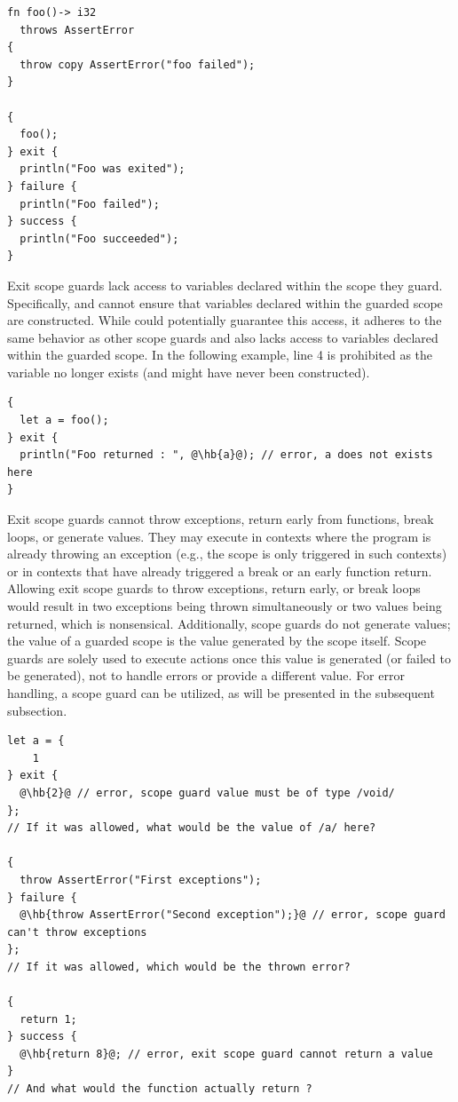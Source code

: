 \begin{lstlisting}[style=coloredverbatim]
fn foo()-> i32
  throws AssertError
{
  throw copy AssertError("foo failed");
}

{
  foo();
} exit {
  println("Foo was exited");
} failure {
  println("Foo failed");
} success {
  println("Foo succeeded");
}
\end{lstlisting}

Exit scope guards lack access to variables declared within the scope they guard.
Specifically,  and  cannot ensure that variables
declared within the guarded scope are constructed. While  could
potentially guarantee this access, it adheres to the same behavior as other
scope guards and also lacks access to variables declared within the guarded
scope. In the following example, line 4 is prohibited as the variable 
no longer exists (and might have never been constructed).

\begin{lstlisting}[style=coloredverbatimError, escapechar=@]
{
  let a = foo();
} exit {
  println("Foo returned : ", @\hb{a}@); // error, a does not exists here
}
\end{lstlisting}

Exit scope guards cannot throw exceptions, return early from functions, break
loops, or generate values. They may execute in contexts where the program is
already throwing an exception (e.g., the  scope is only triggered
in such contexts) or in contexts that have already triggered a break or an early
function return. Allowing exit scope guards to throw exceptions, return early,
or break loops would result in two exceptions being thrown simultaneously or two
values being returned, which is nonsensical. Additionally, scope guards do not
generate values; the value of a guarded scope is the value generated by the
scope itself. Scope guards are solely used to execute actions once this value is
generated (or failed to be generated), not to handle errors or provide a
different value. For error handling, a  scope guard can be
utilized, as will be presented in the subsequent subsection.

\begin{lstlisting}[style=coloredverbatimError, escapechar=@]
let a = {
    1
} exit {
  @\hb{2}@ // error, scope guard value must be of type /void/
};
// If it was allowed, what would be the value of /a/ here?

{
  throw AssertError("First exceptions");
} failure {
  @\hb{throw AssertError("Second exception");}@ // error, scope guard can't throw exceptions
};
// If it was allowed, which would be the thrown error?

{
  return 1;
} success {
  @\hb{return 8}@; // error, exit scope guard cannot return a value
}
// And what would the function actually return ?
\end{lstlisting}

